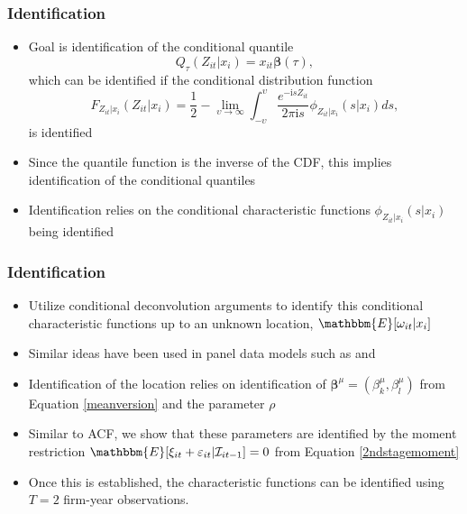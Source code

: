 \documentclass[xcolor={dvipsnames}, notheorems]{beamer}
\theoremstyle{plain}
\begin{document}

\begin{frame}
\frametitle{Identification}
\begin{itemize}
\item Goal is identification of the conditional quantile
\begin{equation*}
Q_{\tau}(Z_{it}|x_{i})=x_{it}\boldsymbol\beta(\tau),
\end{equation*}
which can be identified if the conditional distribution function
\begin{equation}\label{CDF}
F_{Z_{it}|x_{i}}(Z_{it}|x_{i})=\frac{1}{2}-\underset{\upsilon\rightarrow \infty}{\operatorname{lim}}\int_{-\upsilon}^{\upsilon}\frac{e^{-\mathrm{i}sZ_{it}}}{2\pi \mathrm{i}s}\phi_{Z_{it}|x_{i}}(s|x_{i})ds,
\end{equation}
is identified
\item Since the quantile function is the inverse of the CDF, this implies identification of the conditional quantiles
\item Identification relies on the conditional characteristic functions $\phi_{Z_{it}|x_{i}}(s|x_{i})$ being identified
\end{itemize}
\end{frame}


\begin{frame}
\frametitle{Identification}
\begin{itemize}
\item Utilize conditional deconvolution arguments to identify this conditional characteristic functions up to an unknown location, $\mathbbm{E}[\omega_{it}|x_{i}]$
\item Similar ideas have been used in panel data models such as \cite{Neumann2007} and \cite{evdo2010}
\item Identification of the location relies on identification of $\boldsymbol{\beta}^{\mu}=(\beta_{k}^{\mu}, \beta_{l}^{\mu})$ from Equation \eqref{meanversion} and the parameter $\rho$
\item Similar to ACF, we show that these parameters are identified by the moment restriction $\mathbbm{E}[\xi_{it}+\varepsilon_{it}|\mathcal{I}_{it-1}]=0$ from Equation \eqref{2ndstagemoment}
\item Once this is established, the characteristic functions can be identified using $T=2$ firm-year observations.
\end{itemize}
\end{frame}
\end{document}
